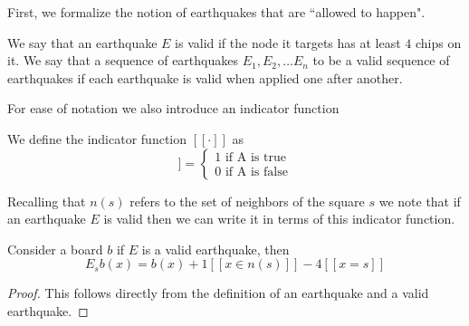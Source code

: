 \documentclass[runningheads,a4paper]{llncs}
\begin{document}
First, we formalize the notion of earthquakes that are ``allowed to happen".

\begin{definition}
We say that an earthquake $E$ is valid if the node it targets has at least $4$ chips on it. 
We say that a sequence of earthquakes $E_1, E_2, \ldots E_n$ to be a valid sequence of earthquakes if each earthquake is valid when applied one after another. 
\end{definition}


For ease of notation we also introduce an indicator function
\begin{definition}
We define the indicator function $[[\cdot]]$ as 
\begin{equation*}
[[A]] = \begin{cases} 1 \text{ if A is true} \\ 0 \text{ if A is false} \end{cases}
\end{equation*}
\end{definition}

Recalling that $n(s)$ refers to the set of neighbors of the square $s$ we note that if an earthquake $E$ is valid then we can write it in terms of this indicator function.
\begin{lemma} 
\label{earthquakeredefine}
Consider a board $b$ if $E$ is a valid earthquake, then 
\begin{equation*}
E_s b(x) = b(x) + 1[[ x \in n(s)]] - 4[[x =s]]
\end{equation*}
\end{lemma}
\begin{proof}
This follows directly from the definition of an earthquake and a valid earthquake. 
\end{proof}
\end{document}

